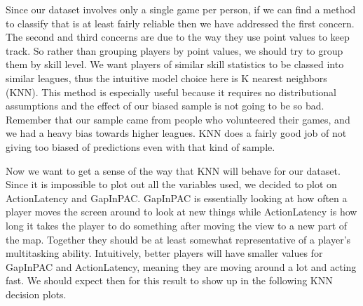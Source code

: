 \documentclass[letterpaper,10pt,english]{/usr/share/sphinx/texinputs/sphinxhowto}
\begin{document}
Since our dataset involves only a single game per person, if we can find
a method to classify that is at least fairly reliable then we have
addressed the first concern. The second and third concerns are due to
the way they use point values to keep track. So rather than grouping
players by point values, we should try to group them by skill level. We
want players of similar skill statistics to be classed into similar
leagues, thus the intuitive model choice here is K nearest neighbors
(KNN). This method is especially useful because it requires no
distributional assumptions and the effect of our biased sample is not
going to be so bad. Remember that our sample came from people who
volunteered their games, and we had a heavy bias towards higher leagues.
KNN does a fairly good job of not giving too biased of predictions even
with that kind of sample.

Now we want to get a sense of the way that KNN will behave for our
dataset. Since it is impossible to plot out all the variables used, we
decided to plot on ActionLatency and GapInPAC. GapInPAC is essentially
looking at how often a player moves the screen around to look at new
things while ActionLatency is how long it takes the player to do
something after moving the view to a new part of the map. Together they
should be at least somewhat representative of a player's multitasking
ability. Intuitively, better players will have smaller values for
GapInPAC and ActionLatency, meaning they are moving around a lot and
acting fast. We should expect then for this result to show up in the
following KNN decision plots.


    

        
        

            
\end{document}
